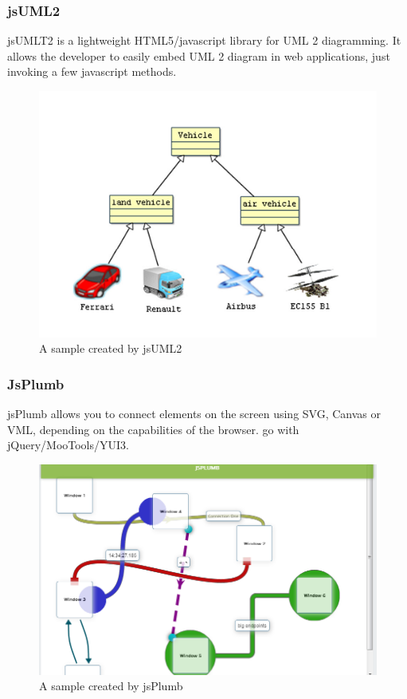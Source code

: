 \documentclass[14pt,a4paper]{extreport}
\begin{document}
 			\subsubsection{jsUML2}
 			jsUMLT2 is a lightweight HTML5/javascript library for UML 2 diagramming. It allows the developer to easily embed UML 2 diagram in web applications, just invoking a few javascript methods.
 			\begin{figure}[ht]
 					\begin{center}
 						\includegraphics[scale=0.5]{jsUML2.png}
 						\caption{A sample created by jsUML2}
 					\end{center}
 				\end{figure} 
 			\subsubsection{JsPlumb}
 			jsPlumb allows you to connect elements on the screen using SVG, Canvas or VML, depending on the capabilities of the browser. go with jQuery/MooTools/YUI3.
 			\begin{figure}[ht]
 					\begin{center}
 						\includegraphics[scale=0.5]{jsplumb.png}
 						\caption{A sample created by jsPlumb}
 					\end{center}
 				\end{figure} 
\end{document}
